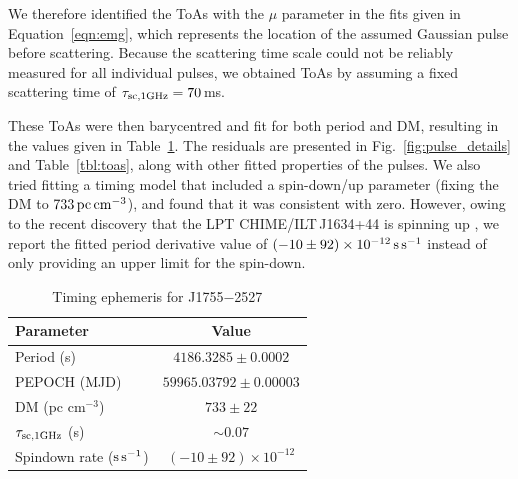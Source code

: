\documentclass[fleqn,usenatbib]{mnras}
\newcommand{\src}{J1755$-$2527}
\newcommand{\Fig}{Fig.}
\newcommand{\Tab}{Table}
\newcommand{\Eqn}{Equation}
\begin{document}
We therefore identified the ToAs with the $\mu$ parameter in the fits given in \Eqn~\ref{eqn:emg}, which represents the location of the assumed Gaussian pulse before scattering.
Because the scattering time scale could not be reliably measured for all individual pulses, we obtained ToAs by assuming a fixed scattering time of $\tau_{\rm sc,1 GHz} = 70$\,ms.

These ToAs were then barycentred and fit for both period and DM, resulting in the values given in \Tab~\ref{tbl:ephemeris}.
The residuals are presented in \Fig~\ref{fig:pulse_details} and \Tab~\ref{tbl:toas}, along with other fitted properties of the pulses.
We also tried fitting a timing model that included a spin-down/up parameter (fixing the DM to $733\,{\rm pc}\,{\rm cm}^{-3}$), and found that it was consistent with zero.
However, owing to the recent discovery that the LPT CHIME/ILT\,J1634+44 is spinning up \citep[$\dot{P} = (-9.03 \pm 0.11) \times 10^{-12}\,{\rm s}\,{\rm s}^{-1}$;][]{2025arXiv250705139D,2025arXiv250705078B}, we report the fitted period derivative value of $(-10 \pm 92) \times 10^{-12}\,{\rm s}\,{\rm s}^{-1}$ instead of only providing an upper limit for the spin-down.

\begin{table}
  \centering
  \caption{Timing ephemeris for \src{}}
  \label{tbl:ephemeris}
  \begin{tabular}{lc}
    \hline
    Parameter & Value \\
    \hline
    Period (s) & $4186.3285 \pm 0.0002$ \\
    PEPOCH (MJD) & $59965.03792 \pm 0.00003$ \\
    DM (pc cm$^{-3}$) & $733 \pm 22$ \\
    $\tau_{\rm sc,1 GHz}$ (s) & ${\sim}0.07$ \\
    Spindown rate (${\rm s}\,{\rm s}^{-1}$) & $(-10 \pm 92) \times 10^{-12}$ \\
    \hline
  \end{tabular}
\end{table}
\end{document}
